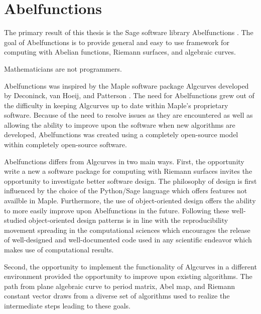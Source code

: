 \chapter{Abelfunctions} \label{ch:abelfunctions}

The primary result of this thesis is the Sage software library Abelfunctions
\cite{abelfunctions}. The goal of Abelfunctions is to provide general and easy
to use framework for computing with Abelian functions, Riemann surfaces, and
algebraic curves.

Mathematicians are not programmers.

Abelfunctions was inspired by the Maple software package Algcurves developed by
Deconinck, van Hoeij, and Patterson \cite{DeconinckPatterson11}. The need for
Abelfunctions grew out of the difficulty in keeping Algcurves up to date within
Maple's proprietary software. Because of the need to resolve issues as they are
encountered as well as allowing the ability to improve upon the software when
new algorithms are developed, Abelfunctions was created using a completely
open-source model within completely open-source software.

Abelfunctions differs from Algcurves in two main ways. First, the opportunity
write a new a software package for computing with Riemann surfaces invites the
opportunity to investigate better software design. The philosophy of design is
first influenced by the choice of the Python/Sage language which offers features
not availble in Maple. Furthermore, the use of object-oriented design offers the
ability to more easily improve upon Abelfunctions in the future. Following these
well-studied object-oriented design patterns \cite{gamma1995design} is in line
with the reproducibility movement spreading in the computational sciences
\cite{stodden2012reproducible} which encourages the release of well-designed and
well-documented code used in any scientific endeavor which makes use of
computational results.

Second, the opportunity to implement the functionality of Algcurves in a
different environment provided the opportunity to improve upon existing
algorithms. The path from plane algebraic curve to period matrix, Abel map, and
Riemann constant vector draws from a diverse set of algorithms used to realize
the intermediate steps leading to these goals.

